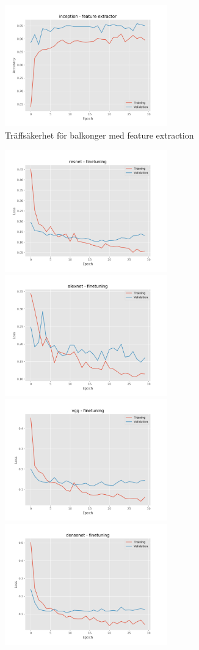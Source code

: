 \documentclass[]{kththesis}
\begin{document}
\begin{figure}[h]
    \includegraphics[width=7cm]{b_a_inception_fe}
    \caption{Träffsäkerhet för balkonger med feature extraction}
    \label{fig:b_a_1}
  \end{figure}
  
  \begin{figure}[h]
    \includegraphics[width=7cm]{b_l_resnet_fine}
    \includegraphics[width=7cm]{b_l_alexnet_fine}
    \includegraphics[width=7cm]{b_l_vgg_fine}
    \includegraphics[width=7cm]{b_l_densenet_fine}

\end{figure}
\end{document}

